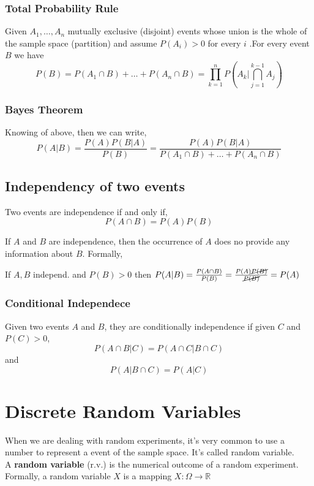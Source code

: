 \subsubsection{Total Probability Rule}
Given $A_1,\dots,A_n$ mutually exclusive (disjoint) events whose union is the
whole of the sample space (partition) and assume $P(A_i) > 0$ for every $i$ .For
every event $B$ we have
\[ P(B) = P(A_1\cap B) + \dots + P(A_n \cap B) =
\prod_{k=1}^{n}P(A_k|\bigcap_{j=1}^{k-1}A_j)\]

\subsubsection{Bayes Theorem}
Knowing of above, then we can write,
\[ P(A|B) = \frac{P(A)P(B|A)}{P(B)} =  \frac{P(A)P(B|A)}{P(A_1\cap B) + \dots +
P(A_n \cap B)}\]

\subsection{Independency of two events}
Two events are independence if and only if,
\[ P(A\cap B) = P(A)P(B)\]

If $A$ and $B$ are independence, then the occurrence of $A$ does no provide any
information about $B$. Formally,
\begin{center}
    If $A, B$ independ. and $P(B)>0$ then $P(A|B) = \frac{P(A\cap B)}{P(B)} =
    \frac{P(A)\cancel{P(B)}}{\cancel{P(B)}} = P(A)$
\end{center}

\subsubsection{Conditional Independece}
Given two events $A$ and $B$, they are conditionally independence if given $C$
and $P(C)>0$, 
\[ P(A\cap B|C) = P(A\cap C|B\cap C) \] and
\[ P(A|B\cap C) = P(A|C)\]


\section{Discrete Random Variables}
When we are dealing with random experiments, it's very common to use a number to
represent a event of the sample space. It's called random variable.\\

A \textbf{random variable} (r.v.) is the numerical outcome of a random
experiment. Formally, a random variable $X$ is a mapping $X: \Omega \rightarrow
\mathbb{R}$ 

